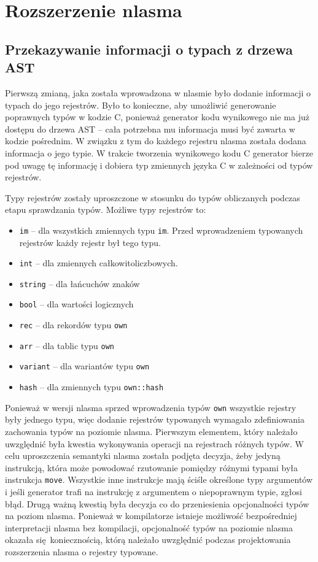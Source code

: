 \documentclass[licencjacka]{pracamgr}
\begin{document}
\chapter{Rozszerzenie nlasma}
\section{Przekazywanie informacji o typach z drzewa AST}
Pierwszą zmianą, jaka została wprowadzona w nlasmie było dodanie informacji o typach do jego rejestrów.
Było to konieczne, aby umożliwić generowanie poprawnych typów w kodzie C, ponieważ generator kodu wynikowego
nie ma już dostępu do drzewa AST -- cała potrzebna mu informacja musi być zawarta w kodzie pośrednim.
W związku z tym do każdego rejestru nlasma została dodana informacja o jego typie.
W trakcie tworzenia wynikowego kodu C generator bierze pod uwagę tę informację i dobiera typ zmiennych języka C
w zależności od typów rejestrów.

Typy rejestrów zostały uproszczone w stosunku do typów obliczanych podczas etapu sprawdzania typów.
Możliwe typy rejestrów to:
\begin{itemize}
 \item \texttt{im} -- dla wszystkich zmiennych typu \texttt{im}. Przed wprowadzeniem typowanych rejestrów
 każdy rejestr był tego typu.
 \item \texttt{int} -- dla zmiennych całkowitoliczbowych.
 \item \texttt{string} -- dla łańcuchów znaków
 \item \texttt{bool} -- dla wartości logicznych
 \item \texttt{rec} -- dla rekordów typu \texttt{own}
 \item \texttt{arr} -- dla tablic typu \texttt{own}
 \item \texttt{variant} -- dla wariantów typu \texttt{own}
 \item \texttt{hash} -- dla zmiennych typu \texttt{own::hash}
\end{itemize}


Ponieważ w wersji nlasma sprzed wprowadzenia typów \texttt{own} wszystkie rejestry były jednego typu, więc
dodanie rejestrów typowanych wymagało zdefiniowania zachowania typów na poziomie nlasma.
Pierwszym elementem, który należało uwzględnić była kwestia wykonywania operacji na rejestrach różnych typów.
W celu uproszczenia semantyki nlasma została podjęta decyzja, żeby jedyną instrukcją, która może powodować
rzutowanie pomiędzy różnymi typami była instrukcja \texttt{move}.
Wszystkie inne instrukcje mają ściśle określone typy argumentów i jeśli generator trafi na instrukcję z argumentem
o niepoprawnym typie, zgłosi błąd. Drugą ważną kwestią była decyzja co do przeniesienia opcjonalności typów
na poziom nlasma. Ponieważ w kompilatorze istnieje możliwość bezpośredniej interpretacji nlasma bez kompilacji,
opcjonalność typów na poziomie nlasma okazała się koniecznością, którą należało uwzględnić podczas projektowania
rozszerzenia nlasma o rejestry typowane.
\end{document}
